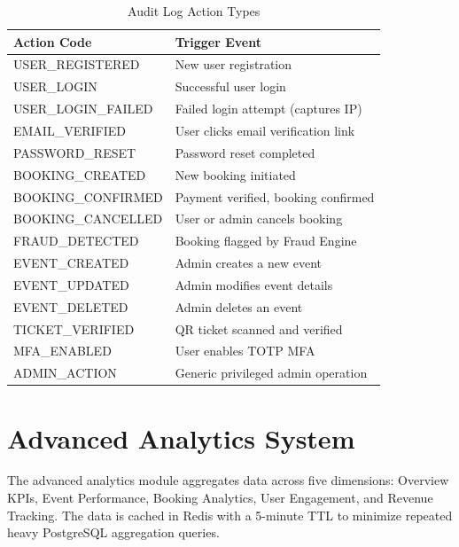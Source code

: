 \documentclass[12pt,a4paper]{report}
\begin{document}
\begin{table}[H]
    \centering
    \caption{Audit Log Action Types}
    \vspace{0.2cm}
    \begin{tabular}{|p{5cm}|p{8cm}|}
        \hline
        \textbf{Action Code} & \textbf{Trigger Event} \\
        \hline
        USER\_REGISTERED & New user registration \\
        \hline
        USER\_LOGIN & Successful user login \\
        \hline
        USER\_LOGIN\_FAILED & Failed login attempt (captures IP) \\
        \hline
        EMAIL\_VERIFIED & User clicks email verification link \\
        \hline
        PASSWORD\_RESET & Password reset completed \\
        \hline
        BOOKING\_CREATED & New booking initiated \\
        \hline
        BOOKING\_CONFIRMED & Payment verified, booking confirmed \\
        \hline
        BOOKING\_CANCELLED & User or admin cancels booking \\
        \hline
        FRAUD\_DETECTED & Booking flagged by Fraud Engine \\
        \hline
        EVENT\_CREATED & Admin creates a new event \\
        \hline
        EVENT\_UPDATED & Admin modifies event details \\
        \hline
        EVENT\_DELETED & Admin deletes an event \\
        \hline
        TICKET\_VERIFIED & QR ticket scanned and verified \\
        \hline
        MFA\_ENABLED & User enables TOTP MFA \\
        \hline
        ADMIN\_ACTION & Generic privileged admin operation \\
        \hline
    \end{tabular}
\end{table}

\section{Advanced Analytics System}
The advanced analytics module aggregates data across five dimensions: Overview KPIs, Event Performance, Booking Analytics, User Engagement, and Revenue Tracking. The data is cached in Redis with a 5-minute TTL to minimize repeated heavy PostgreSQL aggregation queries.
\end{document}
